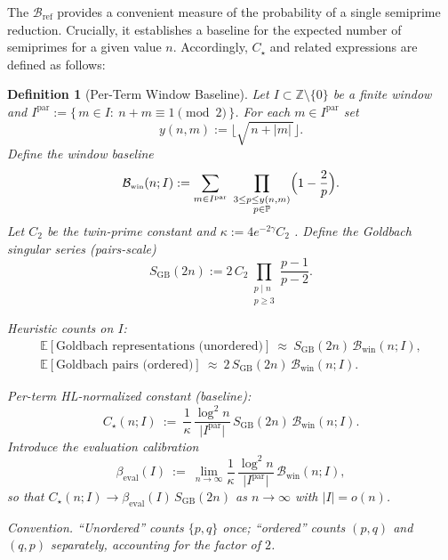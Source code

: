 \documentclass[11pt]{article}
\theoremstyle{inline}
\theoremstyle{break}
\theoremstyle{break}
\theoremstyle{break}
\theoremstyle{break}
\theoremstyle{break}
\theoremstyle{break}
\theoremstyle{break}
\newtheorem{definition}{Definition}
\theoremstyle{inline}
\newcommand{\twin}{{\scriptscriptstyle\mathrm{win}}}
\newcommand{\tref}{{\scriptscriptstyle\mathrm{ref}}}
\newcommand{\Bwin}{\mathcal{B}_\twin}
\newcommand{\Bref}{\mathcal{B}_\tref}
\newcommand{\betacal}{\beta_{\mathrm{eval}}}
\begin{document}
The \( \Bref \) provides a convenient measure of the probability of a single semiprime reduction.  Crucially, it establishes a baseline for the expected number of semiprimes for a given value \( n \).  Accordingly, \( C_\star \) and related expressions are defined as follows:

\begin{definition}[Per-Term Window Baseline]\label{def:window-baseline}
Let \(I\subset\mathbb Z\setminus\{0\}\) be a finite window and
\(I^{\mathrm{par}}:=\{\,m\in I:\ n+m\equiv 1 \pmod 2\,\}\).
For each \(m\in I^{\mathrm{par}}\) set
\begin{equation}
y(n,m):=\bigl\lfloor\sqrt{\,n+|m|\,}\bigr\rfloor.
\end{equation}
Define the \emph{window baseline}
\begin{equation}
\Bwin(n;I):=\sum_{m\in I^{\mathrm{par}}}\ \prod_{\substack{3\le p\le y(n,m)\\ p\in\mathbb P}}
\Bigl(1-\frac{2}{p}\Bigr).
\end{equation}
Let \(C_2\) be the twin-prime constant and \(\kappa:=4e^{-2\gamma}C_2\) \cite{HardyLittlewood1923, MontgomeryVaughan2007}.
Define the Goldbach singular series (pairs-scale)
\begin{equation}
S_{\mathrm{GB}}(2n):=2\,C_2\!\!\prod_{\substack{p\mid n\\ p\ge 3}}\frac{p-1}{p-2}.
\end{equation}

\emph{Heuristic counts on \(I\):}
\begin{equation}
\begin{aligned}
\mathbb{E}[\text{Goldbach representations (unordered)}]\ \approx\ S_{\mathrm{GB}}(2n)\,\Bwin(n;I), \\
\mathbb{E}[\text{Goldbach pairs (ordered)}]\ \approx\ 2\,S_{\mathrm{GB}}(2n)\,\Bwin(n;I).
\end{aligned}
\end{equation}

\emph{Per-term HL-normalized constant (baseline):}
\begin{equation}
C_\star(n;I)
\ :=\
\frac{1}{\kappa}\,\frac{\log^2 n}{\lvert I^{\mathrm{par}}\rvert}\,
S_{\mathrm{GB}}(2n)\,\Bwin(n;I).
\end{equation}
Introduce the evaluation calibration
\begin{equation}
\betacal(I)\ :=\ \lim_{n\to\infty}\frac{1}{\kappa}\,\frac{\log^2 n}{\lvert I^{\mathrm{par}}\rvert}\,\Bwin(n;I),
\end{equation}
so that \(C_\star(n;I)\to \betacal(I)\,S_{\mathrm{GB}}(2n)\) as \(n\to\infty\) with \(\lvert I\rvert=o(n)\).

\noindent\emph{Convention.} “Unordered” counts \(\{p,q\}\) once; “ordered” counts \((p,q)\) and \((q,p)\) separately, accounting for the factor of \(2\).
\end{definition}
\end{document}
